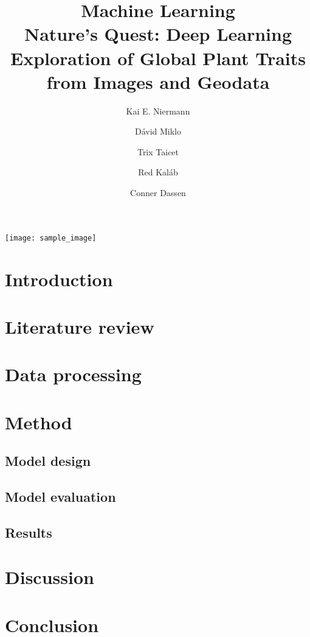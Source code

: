 \documentclass[12pt,a4paper,oneside]{article}
\title{
    \Huge{Machine Learning} \\ \LARGE 
    Nature's Quest: Deep Learning Exploration of Global Plant Traits from Images and Geodata
}
\author{
Kai E. Niermann \and
Dávid Miklo \and 
Trix Taicet \and
Red Kaláb \and
Conner Dassen
}
\date{\DTMusedate{date}}
\begin{document}
\maketitle

% 

\texttt{[image: sample\_image]}

\begin{abstract}
\end{abstract}

\section{Introduction}

\section{Literature review}

\section{Data processing}

\section{Method}

\subsection{Model design}

\subsection{Model evaluation}

\subsection{Results}

\section{Discussion}

\section{Conclusion}
\end{document}
